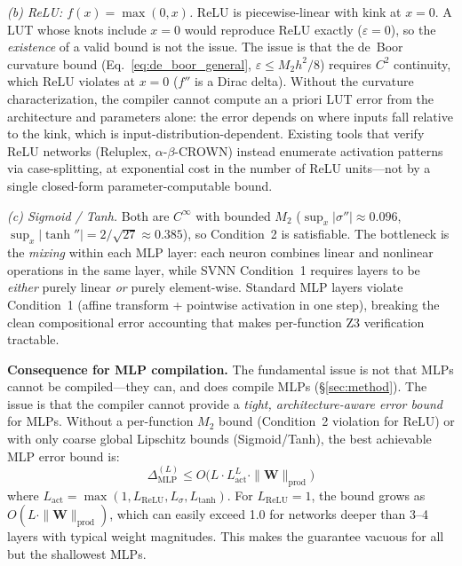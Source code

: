 \vspace{2pt}
\noindent\textit{(b) ReLU: $f(x) = \max(0, x)$.}
ReLU is piecewise-linear with kink at $x = 0$. A LUT whose knots include
$x = 0$ would reproduce ReLU exactly ($\varepsilon = 0$), so the
\emph{existence} of a valid bound is not the issue. The issue is that the
de~Boor curvature bound (Eq.~\ref{eq:de_boor_general}, $\varepsilon \leq
M_2 h^2/8$) requires $C^2$ continuity, which ReLU violates at $x=0$
($f''$ is a Dirac delta). Without the curvature characterization, the
compiler cannot compute an a priori LUT error from the architecture and
parameters alone: the error depends on where inputs fall relative to the
kink, which is input-distribution-dependent. Existing tools that verify
ReLU networks (Reluplex, $\alpha$-$\beta$-CROWN) instead enumerate
activation patterns via case-splitting, at exponential cost in the number
of ReLU units---not by a single closed-form parameter-computable bound.

\vspace{2pt}
\noindent\textit{(c) Sigmoid / Tanh.}
Both are $C^\infty$ with bounded $M_2$ ($\sup_x|\sigma''| \approx 0.096$,
$\sup_x|\tanh''| = 2/\sqrt{27} \approx 0.385$), so Condition~2 is
satisfiable. The bottleneck is the \emph{mixing} within each MLP layer:
each neuron combines linear and nonlinear operations in the same layer, while
SVNN Condition~1 requires layers to be \emph{either} purely linear
\emph{or} purely element-wise. Standard MLP layers violate Condition~1
(affine transform + pointwise activation in one step), breaking the clean
compositional error accounting that makes per-function Z3 verification
tractable.

\vspace{2pt}
\noindent\textbf{Consequence for MLP compilation.}
The fundamental issue is not that MLPs cannot be compiled---they can,
and \neuroplc does compile MLPs ({\S}\ref{sec:method}). The issue is
that the compiler cannot provide a \textit{tight, architecture-aware
error bound} for MLPs. Without a per-function $M_2$ bound (Condition~2
violation for ReLU) or with only coarse global Lipschitz bounds
(Sigmoid/Tanh), the best achievable MLP error bound is:
\begin{equation}
\Delta_{\text{MLP}}^{(L)} \leq O\bigl(L \cdot L_{\text{act}}^L \cdot
\|\mathbf{W}\|_{\text{prod}}\bigr)
\label{eq:mlp_bound}
\end{equation}
where $L_{\text{act}} = \max(1, L_{\text{ReLU}}, L_\sigma, L_{\tanh})$.
For $L_{\text{ReLU}} = 1$, the bound grows as $O(L \cdot
\|\mathbf{W}\|_{\text{prod}})$, which can easily exceed 1.0 for
networks deeper than 3--4 layers with typical weight magnitudes.
This makes the guarantee vacuous for all but the shallowest MLPs.

